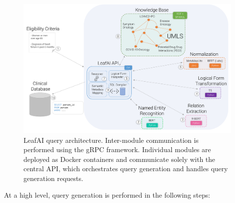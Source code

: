 \documentclass[../main.tex]{subfiles}
\begin{document}
\begin{figure}[h]
  \includegraphics[scale=0.65]{Figures/Aim2/aim2_leafai_architecture.pdf}  
\caption{LeafAI query architecture. Inter-module communication is performed using the gRPC framework. Individual modules are deployed as Docker \cite{docker} containers and communicate solely with the central API, which orchestrates query generation and handles query generation requests.}
\label{aim2_fig_leafai_architecture}
\end{figure}

At a high level, query generation is performed in the following steps:
\end{document}
